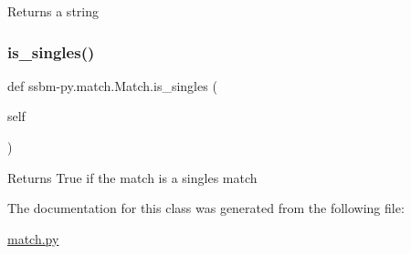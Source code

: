 \begin{DoxyVerb}Returns a string\end{DoxyVerb}
 \mbox{\label{classssbm-py_1_1match_1_1_match_a437a1c291dc23588076add106dcb787b}} 
\subsubsection{\texorpdfstring{is\+\_\+singles()}{is\_singles()}}
{\footnotesize\ttfamily def ssbm-\/py.\+match.\+Match.\+is\+\_\+singles (\begin{DoxyParamCaption}\item[{}]{self }\end{DoxyParamCaption})}

\begin{DoxyVerb}Returns True if the match is a singles match \end{DoxyVerb}
 

The documentation for this class was generated from the following file\+:\begin{DoxyCompactItemize}
\item 
\hyperlink{match_8py}{match.\+py}\end{DoxyCompactItemize}
